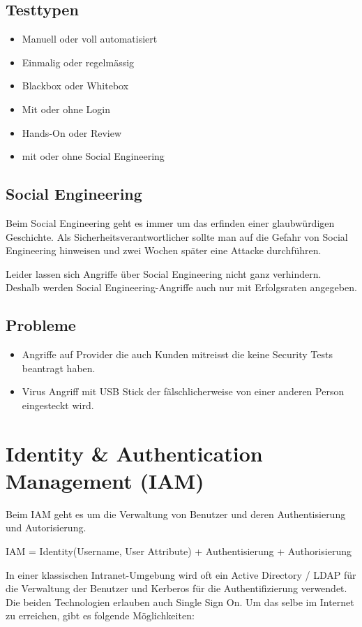 \subsection{Testtypen}
\begin{itemize}
	\item Manuell oder voll automatisiert
	\item Einmalig oder regelmässig
	\item Blackbox oder Whitebox
	\item Mit oder ohne Login
	\item Hands-On oder Review
	\item mit oder ohne Social Engineering 
\end{itemize}

\subsection{Social Engineering}
Beim Social Engineering geht es immer um das erfinden einer glaubwürdigen Geschichte. Als Sicherheitsverantwortlicher sollte man auf die Gefahr von Social Engineering hinweisen und zwei Wochen später eine Attacke durchführen.

Leider lassen sich Angriffe über Social Engineering nicht ganz verhindern. Deshalb werden Social Engineering-Angriffe auch nur mit Erfolgsraten angegeben.

\subsection{Probleme}
\begin{itemize}
	\item Angriffe auf Provider die auch Kunden mitreisst die keine Security Tests beantragt haben.
	\item Virus Angriff mit USB Stick der fälschlicherweise von einer anderen Person eingesteckt wird.
\end{itemize}



\section{Identity \& Authentication Management (IAM)}
Beim IAM geht es um die Verwaltung von Benutzer und deren Authentisierung und Autorisierung. 

IAM = Identity(Username, User Attribute) + Authentisierung + Authorisierung

In einer klassischen Intranet-Umgebung wird oft ein Active Directory / LDAP für die Verwaltung der Benutzer und Kerberos für die Authentifizierung verwendet. Die beiden Technologien erlauben auch Single Sign On. Um das selbe im Internet zu erreichen, gibt es folgende Möglichkeiten:


